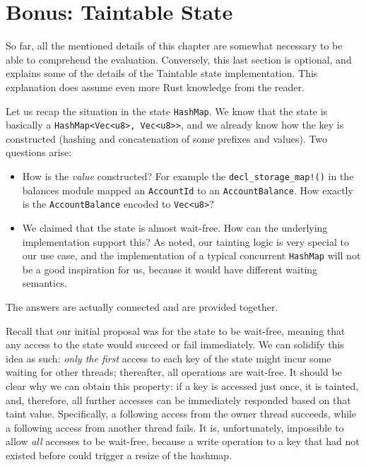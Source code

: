 \section{Bonus: Taintable State} \label{chap_impl:sec:bonus}

So far, all the mentioned details of this chapter are somewhat necessary to be
able to comprehend the evaluation. Conversely, this last section is optional, and explains some of the
details of the Taintable state implementation. This explanation does assume even more Rust
knowledge from the reader.

Let us recap the situation in the state \texttt{HashMap}. We know that the state is basically a
\texttt{HashMap<Vec<u8>, Vec<u8>>}, and we already know how the key is constructed (hashing and
concatenation of some prefixes and values). Two questions arise:

\begin{itemize}
	\item How is the \textit{value} constructed? For example the \texttt{decl\_storage\_map!()} in
	the balances module mapped an \texttt{AccountId} to an \texttt{AccountBalance}. How exactly is
	the \texttt{AccountBalance} encoded to \texttt{Vec<u8>}?
	\item We claimed that the state is almost wait-free. How can the underlying implementation
	support this? As noted, our tainting logic is very special to our use case, and the
	implementation of a typical concurrent \texttt{HashMap} will not be a good inspiration for us,
	because it would have different waiting semantics.
\end{itemize}

The answers are actually connected and are provided together.

Recall that our initial proposal was for the state to be wait-free, meaning that any access to the state
would succeed or fail immediately. We can solidify this idea as such: \textit{only the first} access
to each key of the state might incur some waiting for other threads; thereafter, all operations
are wait-free. It should be clear why we can obtain this property: if a key is accessed just
once, it is tainted, and, therefore, all further accesses can be immediately responded based on that
taint value. Specifically, a following access from the owner thread succeeds, while a following access from
another thread fails. It is, unfortunately,
impossible to allow \textit{all} accesses to be wait-free, because a write operation to a key that
had not existed before could trigger a resize of the hashmap.

